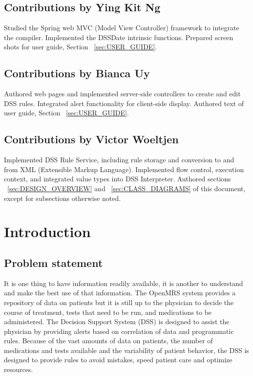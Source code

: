 \documentclass[12pt,letterpaper]{article}
\begin{document}
\subsection{Contributions by Ying Kit Ng}
Studied the Spring web MVC (Model View Controller) framework to integrate 
the compiler. Implemented the DSSDate intrinsic functions. Prepared screen 
shots for user guide, Section ~\ref{sec:USER_GUIDE}.

\subsection{Contributions by Bianca Uy}
Authored web pages and implemented server-side controllers to create and edit 
DSS rules. Integrated alert functionality for client-side display. Authored 
text of user guide, Section ~\ref{sec:USER_GUIDE}.

\subsection{Contributions by Victor Woeltjen}
Implemented DSS Rule Service, including rule storage and conversion to and from XML (Extensible Markup Language). Implemented flow control, execution 
context, and integrated value types into DSS Interpreter. Authored sections 
~\ref{sec:DESIGN_OVERVIEW} and
~\ref{sec:CLASS_DIAGRAMS} of this document, except for subsections otherwise noted.


\newpage 
\section{Introduction} \label{sec:INTRODUCTION}

\subsection{Problem statement}

It is one thing to have information readily available, it is another to understand and make the best use of that information.  The OpenMRS system provides a repository of data on patients but it is still up to the physician to decide the course of treatment, tests that need to be run, and medications to be administered.  The Decision Support System (DSS) is designed to assist the physician by providing alerts based on correlation of data and programmatic rules.  Because of the vast amounts of data on patients, the number of medications and tests available and the variability of patient behavior, the DSS is designed to provide rules to avoid mistakes, speed patient care and optimize resources.
\end{document}
